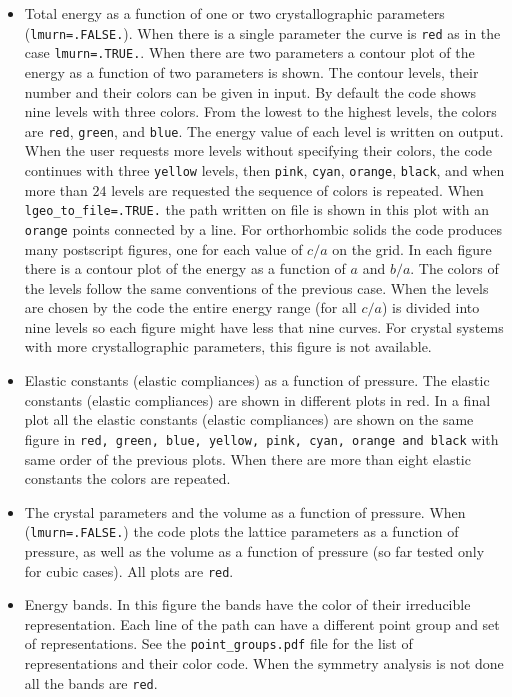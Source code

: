 \documentclass[12pt,a4paper,twoside]{report}
\begin{document}
\begin{itemize}
\item
Total energy as a function of one or two crystallographic parameters
(\texttt{lmurn=.FALSE.}). When there is a single parameter the curve is
\texttt{red} as in the case \texttt{lmurn=.TRUE.}. When there are two
parameters a contour plot of the energy as a function of two parameters
is shown. The contour levels, their number and their colors can be
given in input. By default the code shows nine levels with three
colors. From the lowest to the highest levels, the colors are \texttt{red},
\texttt{green}, and \texttt{blue}. The energy value of each level is 
written on output. When the user requests more levels without specifying
their colors, the code continues with three \texttt{yellow} levels, 
then \texttt{pink}, \texttt{cyan}, \texttt{orange}, \texttt{black}, and
when more than $24$ levels are requested the sequence of colors is repeated.
When \texttt{lgeo\_to\_file=.TRUE.} the path written on file is shown
in this plot with an \texttt{orange} points connected by a line.
For orthorhombic solids the code produces many postscript figures, one
for each value of $c/a$ on the grid. In each figure there is a contour
plot of the energy as a function of $a$ and $b/a$. The colors of the levels
follow the same conventions of the previous case. When the levels are chosen
by the code the entire energy range (for all $c/a$) is divided into nine
levels so each figure might have less that nine curves.
For crystal systems with more crystallographic parameters, this figure is
not available.

\item
Elastic constants (elastic compliances) as a function of pressure. 
The elastic constants (elastic compliances) are shown in different
plots in red. In a final plot all the elastic constants (elastic
compliances) are shown on the same figure in \texttt{red, green, blue, yellow, 
pink, cyan, orange and black} with same order of the previous plots.
When there are more than eight elastic constants the colors are repeated.

\item
The crystal parameters and the volume as a function of pressure.
When (\texttt{lmurn=.FALSE.}) the code plots the lattice parameters 
as a function of pressure, as well as the volume as a function of 
pressure (so far tested only for cubic cases). All plots are \texttt{red}.

\item
Energy bands. In this figure the bands have the color of
their irreducible representation. Each line of the path can have a different
point group and set of representations. See the \texttt{point\_groups.pdf} file
for the list of representations and their color code. 
When the symmetry analysis is not done all the bands are \texttt{red}.


\end{itemize}
\end{document}

